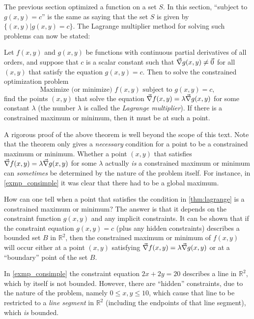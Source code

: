 The previous section optimized a function on a set $S$.  In this section, ``subject to $g(x,y)=c$'' is the same as saying that the set $S$ is given by $\{(x,y)|g(x,y)=c\}$. The Lagrange multiplier method for solving such problems can now be stated:

\begin{theorem}\label{thm:lagrange}%
Let $f(x,y)$ and $g(x,y)$ be functions with continuous partial derivatives of all orders, and suppose that $c$ is a scalar constant such that $\vec\nabla g(x,y) \ne \vec0$ for all $(x,y)$ that satisfy the equation $g(x,y) = c$. Then to solve the constrained optimization problem
\[\text{Maximize (or minimize) }f(x,y)\text{ subject to }g(x,y) = c ,\]
find the points $(x,y)$ that solve the equation $\vec\nabla f(x,y) = \lambda \vec\nabla g(x,y)$ for some constant $\lambda$ (the number $\lambda$ is called the \emph{Lagrange multiplier}). If there is a constrained maximum or minimum, then it must be at such a point.
\end{theorem}

A rigorous proof of the above theorem is well beyond the scope of this text.
Note that the theorem only gives a \emph{necessary} condition for a point to be a constrained maximum or minimum. Whether a point $(x,y)$ that satisfies $\vec\nabla f(x,y) = \lambda \vec\nabla g(x,y)$ for some $\lambda$ actually \emph{is} a constrained maximum or minimum can \emph{sometimes} be determined by the nature of the problem itself. For instance, in \autoref{exmp_consimple} it was clear that there had to be a global maximum.

How can one tell when a point that satisfies the condition in \autoref{thm:lagrange} is a constrained maximum or minimum? The answer is that it depends on the constraint function $g(x,y)$ and any implicit constraints. It can be shown
that if the constraint equation $g(x,y)=c$ (plus any hidden constraints) describes a bounded set $B$ in $\mathbb{R}^2$, then the constrained maximum or minimum of $f(x,y)$ will occur either at a point $(x,y)$ satisfying $\vec\nabla f(x,y) = \lambda \vec\nabla g(x,y)$ or at a ``boundary'' point of the set $B$.


In \autoref{exmp_consimple} the constraint equation $2x+2y=20$ describes a line in $\mathbb{R}^2$, which by itself is not bounded. However, there are ``hidden'' constraints, due to the nature of the problem, namely $0\le x,y \le 10$, which cause that line to be restricted to a \emph{line segment} in $\mathbb{R}^2$ (including the endpoints of that line segment), which \emph{is} bounded.

